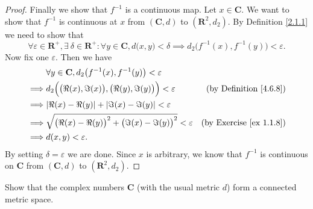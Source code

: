 \begin{proof}
    Finally we show that \(f^{-1}\) is a continuous map.
    Let \(x \in \mathbf{C}\).
    We want to show that \(f^{-1}\) is continuous at \(x\) from \((\mathbf{C}, d)\) to \((\mathbf{R}^2, d_2)\).
    By Definition \ref{2.1.1} we need to show that
    \[
        \forall \varepsilon \in \mathbf{R}^+, \exists\ \delta \in \mathbf{R}^+ : \forall y \in \mathbf{C}, d\big(x, y\big) < \delta \implies d_2\big(f^{-1}(x), f^{-1}(y)\big) < \varepsilon.
    \]
    Now fix one \(\varepsilon\).
    Then we have
    \begin{align*}
                 & \forall y \in \mathbf{C}, d_2\big(f^{-1}(x), f^{-1}(y)\big) < \varepsilon                                            \\
        \implies & d_2\Big(\big(\Re(x), \Im(x)\big), \big(\Re(y), \Im(y)\big)\Big) < \varepsilon  & \text{(by Definition \ref{4.6.8})}  \\
        \implies & \abs*{\Re(x) - \Re(y)} + \abs*{\Im(x) - \Im(y)} < \varepsilon                                                        \\
        \implies & \sqrt{\big(\Re(x) - \Re(y)\big)^2 + \big(\Im(x) - \Im(y)\big)^2} < \varepsilon & \text{(by Exercise \ref{ex 1.1.8})} \\
        \implies & d(x, y) < \varepsilon.
    \end{align*}
    By setting \(\delta = \varepsilon\) we are done.
    Since \(x\) is arbitrary, we know that \(f^{-1}\) is continuous on \(\mathbf{C}\) from \((\mathbf{C}, d)\) to \((\mathbf{R}^2, d_2)\).
\end{proof}

\begin{exercise}\label{ex 4.6.12}
    Show that the complex numbers \(\mathbf{C}\) (with the usual metric \(d\)) form a connected metric space.
\end{exercise}

